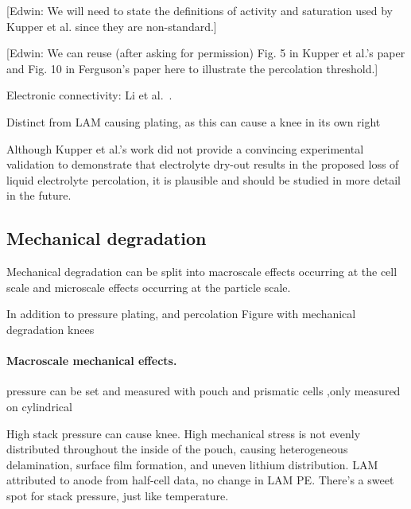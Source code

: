 \documentclass{article}
\begin{document}
[Edwin: We will need to state the definitions of activity and saturation used by Kupper et al. since they are non-standard.]

[Edwin: We can reuse (after asking for permission) Fig. 5 in Kupper et al.'s paper and Fig. 10 in Ferguson's paper here to illustrate the percolation threshold.]

Electronic connectivity: Li et al.~\cite{li_effects_2015}.

Distinct from LAM causing plating, as this can cause a knee in its own right

Although Kupper et al.'s work did not provide a convincing experimental validation to demonstrate that electrolyte dry-out results in the proposed loss of liquid electrolyte percolation, it is plausible and should be studied in more detail in the future. 

\subsection{Mechanical degradation}

Mechanical degradation can be split into macroscale effects occurring at the cell scale and microscale effects occurring at the particle scale.

In addition to pressure plating, and percolation 
Figure with mechanical degradation knees
\paragraph{Macroscale mechanical effects.}
pressure can be set and measured with pouch \cite{wunsch_investigation_2019} and prismatic cells\cite{cannarella_stress_2014} ,only measured on cylindrical \cite{willenberg_high-precision_2020}

High stack pressure can cause knee. High mechanical stress is not evenly distributed throughout the inside of the pouch, causing heterogeneous delamination, surface film formation, and uneven lithium distribution. LAM attributed to anode from half-cell data, no change in LAM PE. There's a sweet spot for stack pressure, just like temperature.\cite{cannarella_stress_2014}
\end{document}
